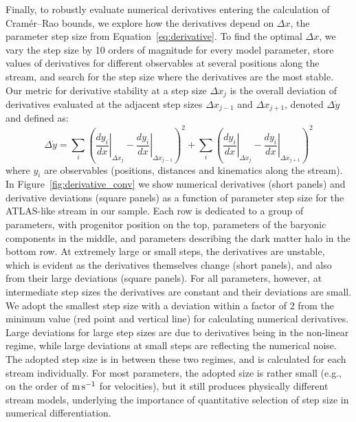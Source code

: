 \documentclass[modern]{aastex62}
\begin{document}
Finally, to robustly evaluate numerical derivatives entering the calculation of Cram\' er--Rao bounds, we explore how the derivatives depend on $\Delta x$, the parameter step size from Equation~\ref{eq:derivative}.
To find the optimal $\Delta x$, we vary the step size by 10 orders of magnitude for every model parameter, store values of derivatives for different observables at several positions along the stream, and search for the step size where the derivatives are the most stable.
Our metric for derivative stability at a step size $\Delta x_j$ is the overall deviation of derivatives evaluated at the adjacent step sizes $\Delta x_{j-1}$ and $\Delta x_{j+1}$, denoted $\Delta \dot{y}$ and defined as:
\begin{equation}
\Delta \dot{y} = \sum_i \left(\left.\frac{dy_i}{dx}\right\vert_{\Delta x_j} - \left.\frac{dy_i}{dx}\right\vert_{\Delta x_{j-1}}\right)^2 + \sum_i \left(\left.\frac{dy_i}{dx}\right\vert_{\Delta x_j} - \left.\frac{dy_i}{dx}\right\vert_{\Delta x_{j+1}}\right)^2
\label{eq:stability}
\end{equation}
where $y_i$ are observables (positions, distances and kinematics along the stream).
In Figure~\ref{fig:derivative_conv} we show numerical derivatives (short panels) and derivative deviations (square panels) as a function of parameter step size for the ATLAS-like stream in our sample.
Each row is dedicated to a group of parameters, with progenitor position on the top, parameters of the baryonic components in the middle, and parameters describing the dark matter halo in the bottom row.
At extremely large or small steps, the derivatives are unstable, which is evident as the derivatives themselves change (short panels), and also from their large deviations (square panels).
For all parameters, however, at intermediate step sizes the derivatives are constant and their deviations are small.
We adopt the smallest step size with a deviation within a factor of 2 from the minimum value (red point and vertical line) for calculating numerical derivatives.
Large deviations for large step sizes are due to derivatives being in the non-linear regime, while large deviations at small steps are reflecting the numerical noise.
The adopted step size is in between these two regimes, and is calculated for each stream individually.
For most parameters, the adopted size is rather small (e.g., on the order of $\rm m\,s^{-1}$ for velocities), but it still produces physically different stream models, underlying the importance of quantitative selection of step size in numerical differentiation.
\end{document}
